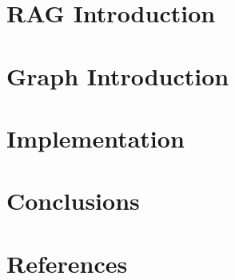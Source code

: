 \section[RAG]{RAG Introduction}


\section[GraphRAG]{Graph Introduction}


% 


\section[Impl]{Implementation}


\section[Conclusion]{Conclusions}


\section[Refs]{References}
